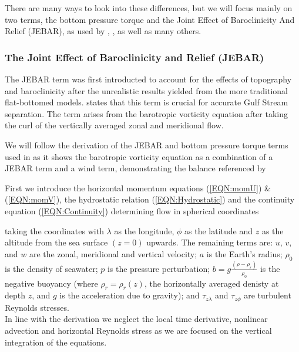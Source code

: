 \documentclass[..\EOYR.tex]{subfiles}
\begin{document}
There are many ways to look into these differences, but we will focus mainly on two terms, the bottom pressure torque and the Joint Effect of Baroclinicity And Relief (JEBAR), as used by \citep{Greatbatch1991}, \citep{Bell1999}, \citep{Gula2014} as well as many others. 


\subsubsection{The Joint Effect of Baroclinicity and Relief (JEBAR)}

The JEBAR term was first introducted to account for the effects of topography and baroclinicity after the unrealistic results yielded from the more traditional flat-bottomed models. \citep{Meyers1996} states that this term is crucial for accurate Gulf Stream separation.
The term arises from the barotropic vorticity equation after taking the curl of the vertically averaged zonal and meridional flow.
\par
We will follow the derivation of the JEBAR and bottom pressure torque terms used in \citep{Greatbatch1991} as it shows the barotropic vorticity equation as a combination of a JEBAR term and a wind term, demonstrating the balance referenced by \citep{NaveiraGarabato2013}

First we introduce the horizontal momentum equations (\ref{EQN:momU}) \& (\ref{EQN:momV}), the hydrostatic relation (\ref{EQN:Hydrostatic}) and the continuity equation (\ref{EQN:Continuity}) determining flow in spherical coordinates






taking the coordinates with $\lambda$ as the longitude, $\phi$ as the latitude and $z$ as the altitude from the sea surface $\left(z=0\right)$ upwards.
The remaining terms are: $u$, $v$, and $w$ are the zonal, meridional and vertical velocity; $a$ is the Earth's radius; $\rho_0$ is the density of seawater; $p$ is the pressure perturbation; $b=g\frac{\left(\rho-\rho_r\right)}{\rho_0}$ is the negative buoyancy (where $\rho_r=\rho_r(z)$, the horizontally averaged denisty at depth $z$, and $g$ is the acceleration due to gravity); and $\tau_{z\lambda}$ and $\tau_{z\phi}$ are turbulent Reynolds stresses.\\
In line with the \citep{Greatbatch1991} derivation 
we neglect the local time derivative, nonlinear advection and horizontal Reynolds stress as we are focused on the vertical integration of the equations.
\end{document}
